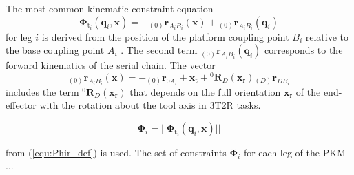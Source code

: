 \documentclass[robotics,article,submit,moreauthors,pdftex]{Definitions/mdpi}
\newcommand{\bm}[1]{\boldsymbol{#1}}
\newcommand{\ortvek}[4]{{ }_{(#1)}{\boldsymbol{#2}}^{#3}_{#4} }
\newcommand{\rotmat}[2]{{{ }^{#1}\boldsymbol{R}}_{#2}}
\begin{document}
The most common kinematic constraint equation 
%
\begin{equation}
\bm{\Phi}_{\mathrm{t}_i}(\bm{q}_i,\bm{x}) = - \ortvek{0}{r}{}{A_iB_i}(\bm{x}) + \ortvek{0}{r}{}{A_iB_i}(\bm{q}_i) 
\end{equation}
%
for leg $i$ is derived from the position of the platform coupling point $B_i$ relative to the base coupling point $A_i$ \cite{Merlet2006}.
The second term $\ortvek{0}{r}{}{A_iB_i}(\bm{q}_i)$ corresponds to the forward kinematics of the serial chain. 
The vector
\begin{equation}
\ortvek{0}{r}{}{A_iB_i}(\bm{x}) = 
- \ortvek{0}{r}{}{0A_i}
+ \bm{x}_{\mathrm{t}} + \rotmat{0}{D}(\bm{x}_{\mathrm{r}}) \ortvek{D}{r}{}{DB_i}
\end{equation}
%
includes the term $\rotmat{0}{D}(\bm{x}_{\mathrm{r}})$ that depends on the full  orientation $\bm{x}_{\mathrm{r}}$ of the end-effector with the rotation about the tool axis in 3T2R tasks.

\begin{equation}
\bm{\Phi}_{i}
=
||\bm{\Phi}_{\mathrm{t}_i}(\bm{q}_i,\bm{x})||
\end{equation}

%
from (\ref{equ:Phir_def}) is used.
The set of constraints $\bm{\Phi}_{i}$ for each leg of the PKM ...
\end{document}
